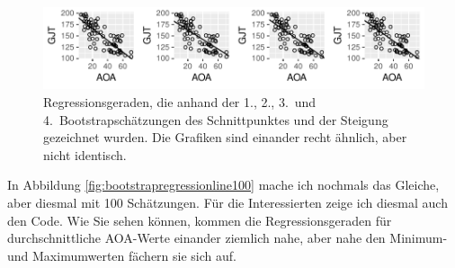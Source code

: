 \documentclass[oneside, 10pt]{book}\usepackage[]{graphicx}\usepackage[]{xcolor}
\newenvironment{knitrout}{}{} %
\begin{document}
\begin{knitrout}
\color{fgcolor}\begin{figure}[tp]

{\centering \includegraphics[width=\textwidth]{figs/unnamed-chunk-211-1} 

}

\caption{Regressionsgeraden, die anhand der 1., 2., 3.\ und 4.\ Bootstrapschätzungen des Schnittpunktes und der Steigung gezeichnet wurden. Die Grafiken sind einander recht ähnlich, aber nicht identisch.\label{fig:bootstrapregressionline}}\label{fig:unnamed-chunk-211}
\end{figure}

\end{knitrout}

In Abbildung \ref{fig:bootstrapregressionline100} mache ich nochmals
das Gleiche, aber diesmal mit 100 Schätzungen.
Für die Interessierten zeige ich diesmal auch den Code. Wie Sie sehen können,
kommen die Regressionsgeraden
für durchschnittliche AOA-Werte
einander ziemlich nahe, aber nahe
den Minimum- und Maximumwerten fächern sie sich auf.
\end{document}
